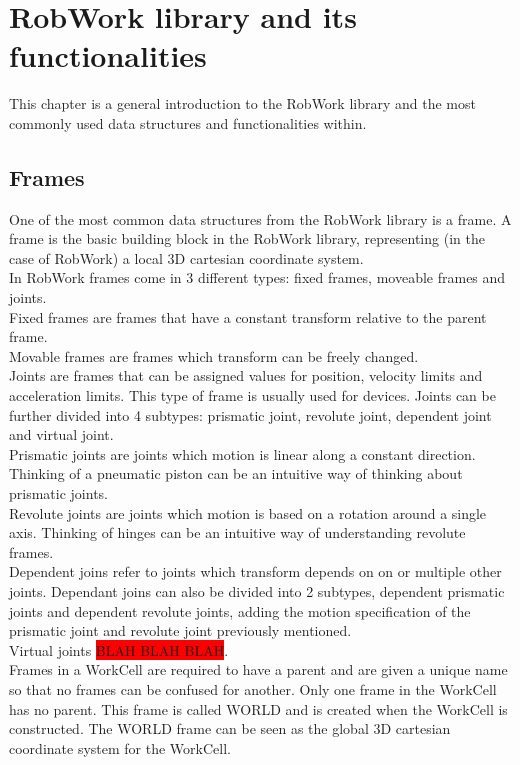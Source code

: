 \section{RobWork library and its functionalities}
This chapter is a general introduction to the RobWork library and the most commonly used data structures and functionalities within.

\subsection{Frames}
One of the most common data structures from the RobWork library is a frame. A frame is the basic building block in the RobWork library, representing (in the case of RobWork) a local 3D cartesian coordinate system.\\

In RobWork frames come in 3 different types: fixed frames, moveable frames and joints.\\
Fixed frames are frames that have a constant transform relative to the parent frame.\\
Movable frames are frames which transform can be freely changed.\\
Joints are frames that can be assigned values for position, velocity limits and acceleration limits. This type of frame is usually used for devices. Joints can be further divided into 4 subtypes: prismatic joint, revolute joint, dependent joint and virtual joint.\\

Prismatic joints are joints which motion is linear along a constant direction. Thinking of a pneumatic piston can be an intuitive way of thinking about prismatic joints.\\

Revolute joints are joints which motion is based on a rotation around a single axis. Thinking of hinges can be an intuitive way of understanding revolute frames.\\

Dependent joins refer to joints which transform depends on on or multiple other joints. Dependant joins can also be divided into 2 subtypes, dependent prismatic joints and dependent revolute joints, adding the motion specification of the prismatic joint and revolute joint previously mentioned.\\

Virtual joints \colorbox{red}{BLAH BLAH BLAH}.\\

Frames in a WorkCell are required to have a parent and are given a unique name so that no frames can be confused for another. Only one frame in the WorkCell has no parent. This frame is called WORLD and is created when the WorkCell is constructed. The WORLD frame can be seen as the global 3D cartesian coordinate system for the WorkCell.\\

